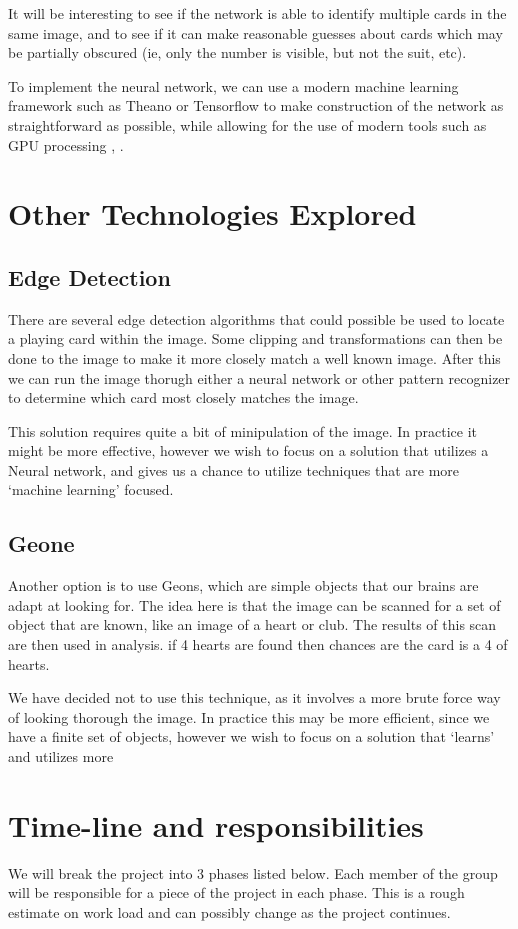 \documentclass{article}
\begin{document}
It will be interesting to see if the network is able to identify multiple cards in the same image, and to see if it can make reasonable guesses about cards which may be partially obscured (ie, only the number is visible, but not the suit, etc).

To implement the neural network, we can use a modern machine learning framework such as Theano or Tensorflow to make construction of the network as straightforward as possible, while allowing for the use of modern tools such as GPU processing \cite{gpu2}, \cite{gpu}.


\section{Other Technologies Explored}
\subsection{Edge Detection}
There are several edge detection algorithms that could possible be used to locate a playing card within the image.  Some clipping and transformations can then be done to the image to make it more closely match a well known image.  After this we can run the image thorugh either a neural network or other pattern recognizer to determine which card most closely matches the image.

This solution requires quite a bit of minipulation of the image.  In practice it might be more effective, however we wish to focus on a solution that utilizes a Neural network, and gives us a chance to utilize techniques that are more `machine learning' focused.

\subsection{Geone}
Another option is to use Geons, which are simple objects that our brains are adapt at looking for.  The idea here is that the image can be scanned for a set of object that are known, like an image of a heart or club.  The results of this scan are then used in analysis.  if 4 hearts are found then chances are the card is a 4 of hearts.

We have decided not to use this technique, as it involves a more brute force way of looking thorough the image.  In practice this may be more efficient, since we have a finite set of objects, however we wish to focus on a solution that `learns' and utilizes more 

\section{Time-line and responsibilities}
We will break the project into 3 phases listed below.  Each member of the group will be responsible for a piece of the project in each phase.  This is a rough estimate on work load and can possibly change as the project continues.
\end{document}
